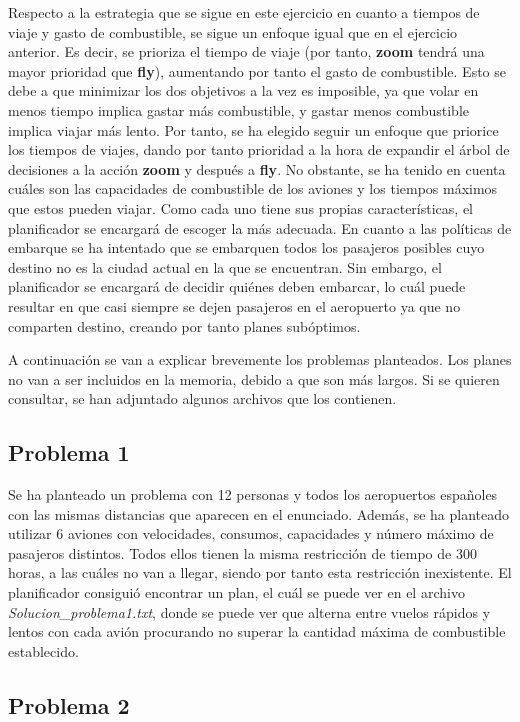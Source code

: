 \documentclass[11pt,a4paper]{article}
\begin{document}
Respecto a la estrategia que se sigue en este ejercicio en cuanto a tiempos de viaje y gasto de combustible, se sigue un enfoque
igual que en el ejercicio anterior. Es decir, se prioriza el tiempo de viaje (por tanto, \textbf{zoom} tendrá una mayor prioridad
que \textbf{fly}), aumentando por tanto el gasto de combustible. Esto se debe a que minimizar los dos objetivos
a la vez es imposible, ya que volar en menos tiempo implica gastar más combustible, y gastar menos combustible implica viajar
más lento. Por tanto, se ha elegido seguir un enfoque que priorice los tiempos de viajes, dando por tanto prioridad a la hora
de expandir el árbol de decisiones a la acción \textbf{zoom} y después a \textbf{fly}. No obstante, se ha tenido en cuenta cuáles
son las capacidades de combustible de los aviones y los tiempos máximos que estos pueden viajar. Como cada uno tiene sus propias
características, el planificador se encargará de escoger la más adecuada. En cuanto a las políticas de embarque se
ha intentado que se embarquen todos los pasajeros posibles cuyo destino no es la ciudad actual en la que se encuentran. Sin embargo,
el planificador se encargará de decidir quiénes deben embarcar, lo cuál puede resultar en que casi siempre se dejen pasajeros
en el aeropuerto ya que no comparten destino, creando por tanto planes subóptimos.

A continuación se van a explicar brevemente los problemas planteados. Los planes no van a ser incluidos en la memoria, debido
a que son más largos. Si se quieren consultar, se han adjuntado algunos archivos que los contienen.

\subsection{Problema 1}

Se ha planteado un problema con 12 personas y todos los aeropuertos españoles con las mismas distancias que aparecen en el enunciado.
Además, se ha planteado utilizar 6 aviones con velocidades, consumos, capacidades y número máximo de pasajeros distintos. Todos ellos
tienen la misma restricción de tiempo de 300 horas, a las cuáles no van a llegar, siendo por tanto esta restricción inexistente.
El planificador consiguió encontrar un plan, el cuál se puede ver en el archivo \textit{Solucion\_problema1.txt}, donde se puede ver
que alterna entre vuelos rápidos y lentos con cada avión procurando no superar la cantidad máxima de combustible establecido.

\subsection{Problema 2}
\end{document}

